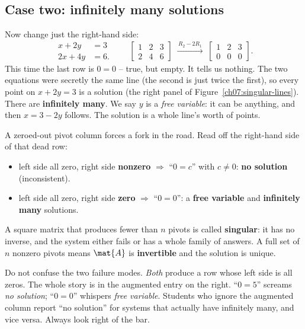 \subsection{Case two: infinitely many solutions}

Now change just the right-hand side:
\[
\begin{aligned}
x + 2y &= 3\\
2x + 4y &= 6.
\end{aligned}
\qquad
\left[\begin{array}{cc|c}
1 & 2 & 3\\
2 & 4 & 6
\end{array}\right]
\;\xrightarrow{\,R_2 - 2R_1\,}\;
\left[\begin{array}{cc|c}
1 & 2 & 3\\
0 & 0 & 0
\end{array}\right].
\]
This time the last row is $0 = 0$ -- true, but empty. It tells us nothing. The
two equations were secretly the same line (the second is just twice the first),
so every point on $x + 2y = 3$ is a solution (the right panel of
Figure~\ref{ch07:singular-lines}). There are \textbf{infinitely
many}. We say $y$ is a \emph{free variable}: it can be anything, and then $x =
3 - 2y$ follows. The solution is a whole line's worth of points.

\begin{focusbox}
A zeroed-out pivot column forces a fork in the road. Read off the right-hand
side of that dead row:
\begin{itemize}
  \item left side all zero, right side \textbf{nonzero} $\Rightarrow$ ``$0 =
  c$'' with $c\neq 0$: \textbf{no solution} (inconsistent).
  \item left side all zero, right side \textbf{zero} $\Rightarrow$ ``$0 = 0$'':
  a \textbf{free variable} and \textbf{infinitely many} solutions.
\end{itemize}
A square matrix that produces fewer than $n$ pivots is called \textbf{singular}:
it has no inverse, and the system either fails or has a whole family of answers.
A full set of $n$ nonzero pivots means $\mat{A}$ is \textbf{invertible} and the
solution is unique.
\end{focusbox}

\begin{trapbox}
Do not confuse the two failure modes. \emph{Both} produce a row whose left side
is all zeros. The whole story is in the augmented entry on the right. ``$0=5$''
screams \emph{no solution}; ``$0=0$'' whispers \emph{free variable}. Students who
ignore the augmented column report ``no solution'' for systems that actually have
infinitely many, and vice versa. Always look right of the bar.
\end{trapbox}

